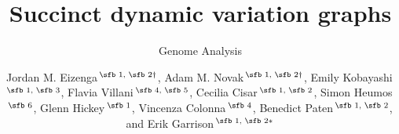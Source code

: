 \documentclass{bioinfo}
\begin{document}

\subtitle{Genome Analysis}

\title[short Title]{Succinct dynamic variation graphs}
\author[Eizenga, \textit{et~al}.]{
Jordan M. Eizenga\,$^{\text{\sfb 1, \sfb 2} \dagger}$, 
Adam M. Novak\,$^{\text{\sfb 1, \sfb 2} \dagger}$, 
Emily Kobayashi\,$^{\text{\sfb 1, \sfb 3}}$,
Flavia Villani\,$^{\text{\sfb 4, \sfb 5}}$,
Cecilia Cisar\,$^{\text{\sfb 1, \sfb 2}}$,
Simon Heumos\,$^{\text{\sfb 6}}$,
Glenn Hickey\,$^{\text{\sfb 1}}$,
Vincenza Colonna\,$^{\text{\sfb 4}}$,
Benedict Paten\,$^{\text{\sfb 1, \sfb 2}}$,
and Erik Garrison\,$^{\text{\sfb 1, \sfb 2}*}$
}

\address{
$^{\text{\sf 1}}$Genomics Institute, University of California Santa Cruz, Santa Cruz, CA, USA, 95064, and \\
$^{\text{\sf 2}}$Biomolecular Engineering and Bioinformatics, University of California Santa Cruz, Santa Cruz, CA, USA, 95064, \\
$^{\text{\sf 3}}$Bioinformatics and Systems Biology, University of California San Diego, La Jolla, CA, USA, 92093, \\
$^{\text{\sf 4}}$Institute of Genetics and Biophysics, Consiglio Nazionale di Ricerche, Naples, Italy, 80131, \\
$^{\text{\sf 5}}$Biotecnologie Mediche, Universit\`a degli Studi di Napoli Federico II, Naples, Italy, 80138, and \\
$^{\text{\sf 6}}$Quantitative Biology Center (QBiC), University of T\"ubingen, T\"ubingen, Germany, 72076
}



\end{document}
